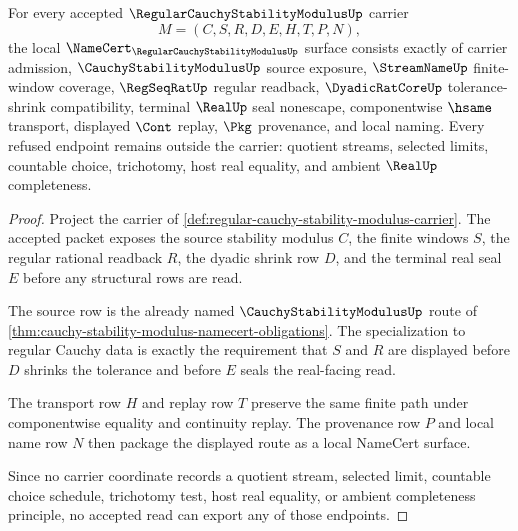 \begin{theorem}
\label{thm:regular-cauchy-stability-modulus-namecert-obligations}
For every accepted $\RegularCauchyStabilityModulusUp$ carrier
$$
M=(C,S,R,D,E,H,T,P,N),
$$
the local $\NameCert_{\RegularCauchyStabilityModulusUp}$ surface consists exactly of carrier admission, $\CauchyStabilityModulusUp$ source exposure, $\StreamNameUp$ finite-window coverage, $\RegSeqRatUp$ regular readback, $\DyadicRatCoreUp$ tolerance-shrink compatibility, terminal $\RealUp$ seal nonescape, componentwise $\hsame$ transport, displayed $\Cont$ replay, $\Pkg$ provenance, and local naming. Every refused endpoint remains outside the carrier: quotient streams, selected limits, countable choice, trichotomy, host real equality, and ambient $\RealUp$ completeness.
\end{theorem}
\begin{proof}
Project the carrier of \autoref{def:regular-cauchy-stability-modulus-carrier}. The accepted packet exposes the source stability modulus $C$, the finite windows $S$, the regular rational readback $R$, the dyadic shrink row $D$, and the terminal real seal $E$ before any structural rows are read.

The source row is the already named $\CauchyStabilityModulusUp$ route of \autoref{thm:cauchy-stability-modulus-namecert-obligations}. The specialization to regular Cauchy data is exactly the requirement that $S$ and $R$ are displayed before $D$ shrinks the tolerance and before $E$ seals the real-facing read.

The transport row $H$ and replay row $T$ preserve the same finite path under componentwise equality and continuity replay. The provenance row $P$ and local name row $N$ then package the displayed route as a local NameCert surface.

Since no carrier coordinate records a quotient stream, selected limit, countable choice schedule, trichotomy test, host real equality, or ambient completeness principle, no accepted read can export any of those endpoints.
\end{proof}

